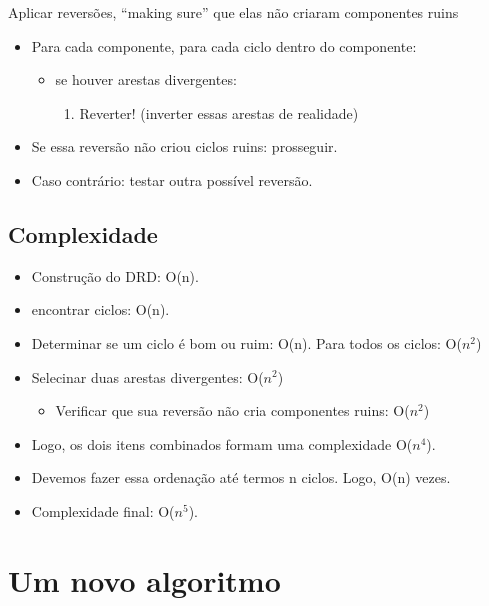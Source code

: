 \documentclass{beamer}
\begin{document}
\begin{frame} {Aplicar reversões, “making sure” que elas não criaram componentes ruins}
	\begin{itemize}
		\item Para cada componente, para cada ciclo dentro do componente: 
		\begin {itemize}
			\item se houver arestas divergentes:
			\begin{enumerate}
				\item Reverter!  (inverter essas arestas de realidade)
			\end{enumerate}
		\end {itemize}
		
		\item Se essa reversão não criou ciclos ruins: prosseguir.
  		\item Caso contrário: testar outra possível reversão.
	\end{itemize}
\end{frame}

\subsection{Complexidade}

\begin{frame}
	\begin{itemize}
		\item Construção do DRD: O(n).
		\item encontrar ciclos: O(n).
		\item Determinar se um ciclo é bom ou ruim: O(n). Para todos os ciclos: O($n^{2}$)
		\item Selecinar duas arestas divergentes: O($n^{2}$)
		\begin{itemize}
			\item Verificar que sua reversão não cria componentes ruins: O($n^{2}$)
		\end{itemize}
		\pause \item Logo, os dois itens combinados formam uma complexidade O($n^{4}$).
		\pause \item Devemos fazer essa ordenação até termos n ciclos. Logo, O(n) vezes.
		\pause \item Complexidade final: O($n^{5}$).
	\end{itemize}
\end{frame}
	
\section{Um novo algoritmo}
\end{document}
